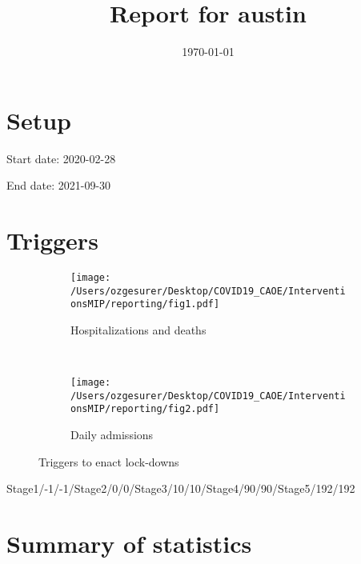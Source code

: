 \documentclass{article}
\title{Report for austin}
\author{}
\date{\today}
\begin{document}
\maketitle

\section*{Setup}

Start date: 2020-02-28

End date: 2021-09-30 




\section*{Triggers}
\begin{figure}[!htb]
  \centering
  \setlength{\unitlength}{1cm}
    \begin{subfigure}[b]{0.475\linewidth}
    \centering
        \texttt{[image: /Users/ozgesurer/Desktop/COVID19\_CAOE/InterventionsMIP/reporting/fig1.pdf]}
        \caption{Hospitalizations  and deaths}
        \label{fig:IHD}
    \end{subfigure}
    ~
    \begin{subfigure}[b]{0.475\linewidth}
    \centering
         \texttt{[image: /Users/ozgesurer/Desktop/COVID19\_CAOE/InterventionsMIP/reporting/fig2.pdf]}
        \caption{Daily admissions}
        \label{fig:IYIH}
    \end{subfigure}
    \caption{Triggers to enact lock-downs}\label{fig:SD90}
\end{figure}

Stage1/-1/-1/Stage2/0/0/Stage3/10/10/Stage4/90/90/Stage5/192/192

\newpage

\section*{Summary of statistics}
\end{document}
